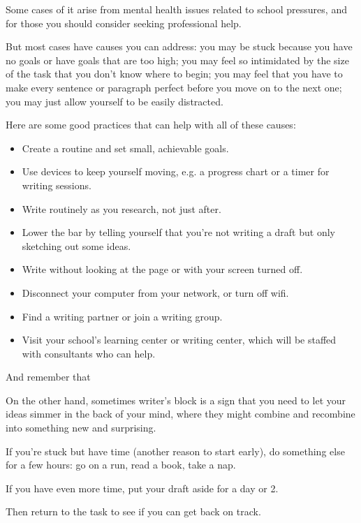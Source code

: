\documentclass[oneside]{book}
\numberwithin{equation}{section}
\begin{document}
Some cases of it arise from mental health issues related to school pressures, and for those you should consider seeking professional help.

But most cases have causes you can address: you may be stuck because you have no goals or have goals that are too high; you may feel so intimidated by the size of the task that you don't know where to begin; you may feel that you have to make every sentence or paragraph perfect before you move on to the next one; you may just allow yourself to be easily distracted.

Here are some good practices that can help with all of these causes:
\begin{itemize}
    \item Create a routine and set small, achievable goals.
    \item Use devices to keep yourself moving, e.g. a progress chart or a timer for writing sessions.
    \item Write routinely as you research, not just after.
    \item Lower the bar by telling yourself that you're not writing a draft but only sketching out some ideas.
    \item Write without looking at the page or with your screen turned off.
    \item Disconnect your computer from your network, or turn off wifi.
    \item Find a writing partner or join a writing group.
    \item Visit your school's learning center or writing center, which will be staffed with consultants who can help.
\end{itemize}
And remember that 


%
On the other hand, sometimes writer's block is a sign that you need to let your ideas simmer in the back of your mind, where they might combine and recombine into something new and surprising.

If you're stuck but have time (another reason to start early), do something else for a few hours: go on a run, read a book, take a nap.

If you have even more time, put your draft aside for a day or 2.

Then return to the task to see if you can get back on track.
\end{document}
